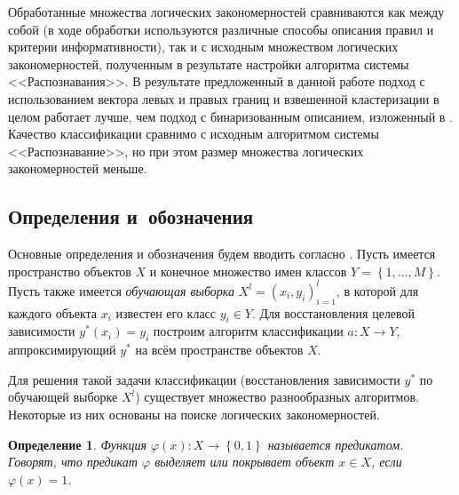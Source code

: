 \documentclass[12pt]{article}
\newtheorem{definition}{Определение}
\begin{document}
Обработанные множества логических закономерностей сравниваются как
между собой (в ходе обработки используются различные способы описания
правил и критерии информативности), так и с исходным множеством
логических закономерностей, полученным в результате настройки
алгоритма системы <<Распознавания>>. В результате предложенный в
данной работе подход с использованием вектора левых и правых границ и
взвешенной кластеризации в целом работает лучше, чем подход с
бинаризованным описанием, изложенный в \cite{novikov15}. Качество
классификации сравнимо с исходным алгоритмом системы
<<Распознавание>>, но при этом размер множества логических
закономерностей меньше.

\subsection{Определения и~обозначения}
\label{subsec:defs}



Основные определения и обозначения будем вводить согласно
\cite{voron10logicalgs}. Пусть имеется пространство объектов \(X\) и
конечное множество имен классов \(Y = \left\{1, \dots,
M\right\}\). Пусть также имеется \emph{обучающая выборка} \(X^{l} =
(x_i, y_i)_{i = 1}^{l}\), в которой для каждого объекта \(x_i\)
известен его класс \(y_i \in Y\).  Для восстановления целевой
зависимости \(y^{*}(x_i) = y_i\) построим алгоритм классификации
\(a\colon X \rightarrow Y\), аппроксимирующий \(y^{*}\) на всём
пространстве объектов \(X\).

Для решения такой задачи классификации (восстановления зависимости
\(y^{*}\) по обучающей выборке \(X^l\)) существует множество
разнообразных алгоритмов. Некоторые из них основаны на поиске
логических закономерностей.

\begin{definition}
  Функция \(\varphi(x) \colon X \rightarrow \left\{0, 1\right\}\)
  называется \emph{предикатом}. Говорят, что предикат
  \(\varphi\) \emph{выделяет} или \emph{покрывает} объект \(x \in X\),
  если \(\varphi(x) = 1\).
\end{definition}
\end{document}
